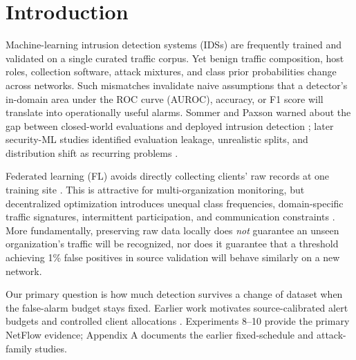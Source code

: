 \documentclass[journal,10pt]{IEEEtran}
\begin{document}
\section{Introduction}
Machine-learning intrusion detection systems (IDSs) are frequently trained and validated on a single curated traffic corpus. Yet benign traffic composition, host roles, collection software, attack mixtures, and class prior probabilities change across networks. Such mismatches invalidate naive assumptions that a detector's in-domain area under the ROC curve (AUROC), accuracy, or F1 score will translate into operationally useful alarms. Sommer and Paxson warned about the gap between closed-world evaluations and deployed intrusion detection \cite{sommer2010}; later security-ML studies identified evaluation leakage, unrealistic splits, and distribution shift as recurring problems \cite{pendlebury2019,arp2022}.

Federated learning (FL) avoids directly collecting clients' raw records at one training site \cite{mcmahan2017}. This is attractive for multi-organization monitoring, but decentralized optimization introduces unequal class frequencies, domain-specific traffic signatures, intermittent participation, and communication constraints \cite{li2020,reddi2021}. More fundamentally, preserving raw data locally does \emph{not} guarantee an unseen organization's traffic will be recognized, nor does it guarantee that a threshold achieving 1\% false positives in source validation will behave similarly on a new network.

Our primary question is how much detection survives a change of dataset when the false-alarm budget stays fixed. Earlier work motivates source-calibrated alert budgets and controlled client allocations \cite{bilal2026,jin2026,khan2025}. Experiments 8--10 provide the primary NetFlow evidence; Appendix A documents the earlier fixed-schedule and attack-family studies.
\end{document}
